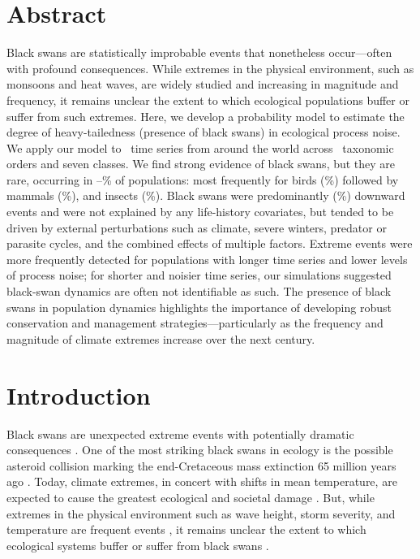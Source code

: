 
\section{Abstract}

Black swans are statistically improbable events that nonetheless occur---often
with profound consequences. While extremes in the physical environment, such
as monsoons and heat waves, are widely studied and increasing in magnitude and
frequency, it remains unclear the extent to which ecological populations
buffer or suffer from such extremes. Here, we develop a probability model to
estimate the degree of heavy-tailedness (presence of black swans) in
ecological process noise. We apply our model to \NPops~time series from around
the world across \NOrders~taxonomic orders and seven classes. We find strong
evidence of black swans, but they are rare, occurring in
\overallMinPerc--\overallMaxPerc\% of populations: most frequently for birds
(\AvesRangePerc\%) followed by mammals (\MammaliaRangePerc\%), and insects
(\InsectaRangePerc\%). Black swans were predominantly (\percBSDown \%)
downward events and were not explained by any life-history covariates, but
tended to be driven by external perturbations such as climate, severe winters,
predator or parasite cycles, and the combined effects of multiple factors.
Extreme events were more frequently detected for populations with longer time
series and lower levels of process noise; for shorter and noisier time series,
our simulations suggested black-swan dynamics are often not identifiable as
such. The presence of black swans in population dynamics highlights the
importance of developing robust conservation and management
strategies---particularly as the frequency and magnitude of climate extremes
increase over the next century.


\section{Introduction}

Black swans are unexpected extreme events with potentially dramatic
consequences \citep{taleb2007,sornette2009}. One of the most striking black
swans in ecology is the possible asteroid collision marking the end-Cretaceous
mass extinction 65 million years ago \citep{alvarez1980,harnik2012}. Today,
climate extremes, in concert with shifts in mean temperature, are expected to
cause the greatest ecological and societal damage \citep{ipcc2012}. But, while
extremes in the physical environment such as wave height, storm severity, and
temperature are frequent events \citep{gaines1993,katz2005}, it remains
unclear the extent to which ecological systems buffer or suffer from black
swans \citep{nunez2012}.

